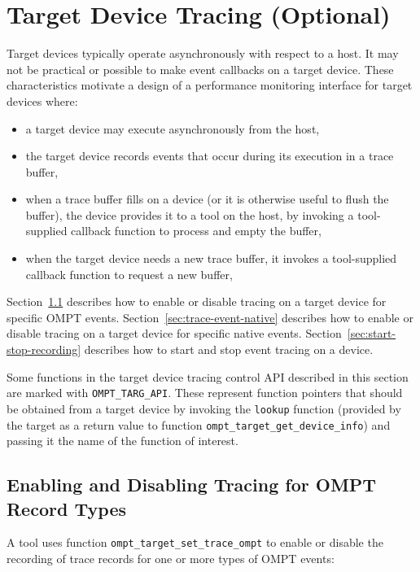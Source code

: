 \documentclass{article}
\begin{document}
\section{Target Device Tracing (Optional)}
\label{sec:target-device-records}

Target devices typically operate asynchronously with respect to a host. It may not be practical or possible to make event callbacks on a target device. These characteristics motivate a design of a performance monitoring interface for target devices where: 
\begin{itemize}
\item a target device may execute asynchronously from the host,
\item the target device records events that occur during its execution in a trace buffer,
\item when a trace buffer fills on a device (or it is otherwise useful to flush the buffer),  the device provides it to a tool on the host, by invoking a tool-supplied callback function to process and empty the buffer,
\item when the target device needs a new trace buffer, it invokes a tool-supplied callback function to request a new buffer,
\end{itemize}


 Section~\ref{sec:trace-event}  describes how to enable or disable tracing on a target device for specific OMPT events. 
  Section~\ref{sec:trace-event-native}  describes how to enable or disable tracing on a target device for specific native events. Section~\ref{sec:start-stop-recording} describes how to start and stop event tracing on a device. 
  
Some functions in the target device tracing control API described in this section are marked with \verb|OMPT_TARG_API|. These represent function pointers that should be obtained from a target device by invoking the \verb|lookup| function (provided by the target  as a return value to function \verb|ompt_target_get_device_info|) and passing it the name of the function of interest.


\subsection{Enabling and Disabling Tracing for OMPT Record Types}
\label{sec:trace-event}
A tool uses function \verb|ompt_target_set_trace_ompt| to enable or disable the recording of trace records for one or more types of OMPT events:
\end{document}
